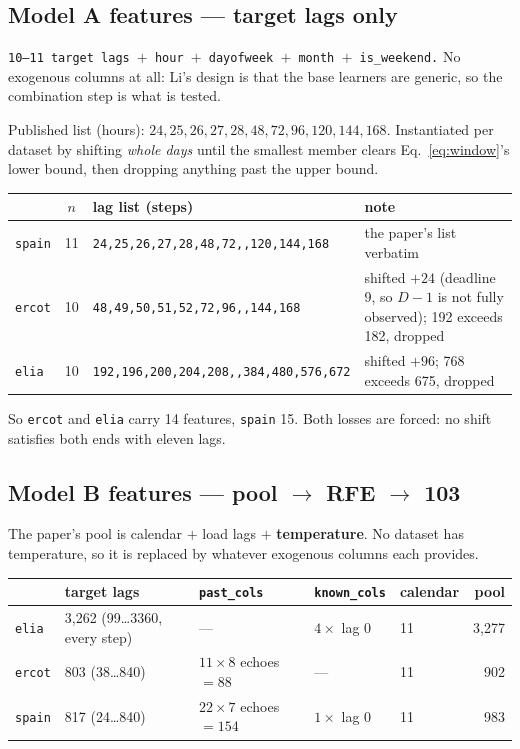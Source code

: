 \documentclass[11pt,a4paper]{article}
\begin{document}
\subsection{Model A features --- target lags only}

\texttt{10--11 target lags $+$ hour $+$ dayofweek $+$ month $+$ is\_weekend.} No exogenous
columns at all: Li's design is that the base learners are generic, so the combination step is
what is tested.

\medskip
\noindent
Published list (hours): $24,25,26,27,28,48,72,96,120,144,168$. Instantiated per dataset by
shifting \emph{whole days} until the smallest member clears Eq.~\eqref{eq:window}'s lower
bound, then dropping anything past the upper bound.

\begin{tabularx}{\textwidth}{@{}l c p{5.2cm} L@{}}
\toprule
 & $n$ & lag list (steps) & note \\
\midrule
\texttt{spain} & 11 & \texttt{24,25,26,27,28,48,72,,120,144,168}
  & the paper's list verbatim \\
\texttt{ercot} & 10 & \texttt{48,49,50,51,52,72,96,,144,168}
  & shifted $+24$ (deadline 9, so $D{-}1$ is not fully observed); 192 exceeds 182, dropped \\
\texttt{elia}  & 10 & \texttt{192,196,200,204,208,,384,480,576,672}
  & shifted $+96$; 768 exceeds 675, dropped \\
\bottomrule
\end{tabularx}

\medskip
\noindent
So \texttt{ercot} and \texttt{elia} carry 14 features, \texttt{spain} 15. Both losses are
forced: no shift satisfies both ends with eleven lags.

\subsection{Model B features --- pool $\rightarrow$ RFE $\rightarrow$ 103}

The paper's pool is calendar $+$ load lags $+$ \textbf{temperature}. No dataset has
temperature, so it is replaced by whatever exogenous columns each provides.

\begin{center}
\small
\begin{tabular}{@{}l l l l l r@{}}
\toprule
 & target lags & \texttt{past\_cols} & \texttt{known\_cols} & calendar & pool \\
\midrule
\texttt{elia}  & 3{,}262 (99\ldots3360, every step) & --- & $4 \times$ lag 0 & 11 & 3{,}277 \\
\texttt{ercot} & 803 (38\ldots840)  & $11 \times 8$ echoes $= 88$  & --- & 11 & 902 \\
\texttt{spain} & 817 (24\ldots840)  & $22 \times 7$ echoes $= 154$ & $1 \times$ lag 0 & 11 & 983 \\
\bottomrule
\end{tabular}
\end{center}
\end{document}
